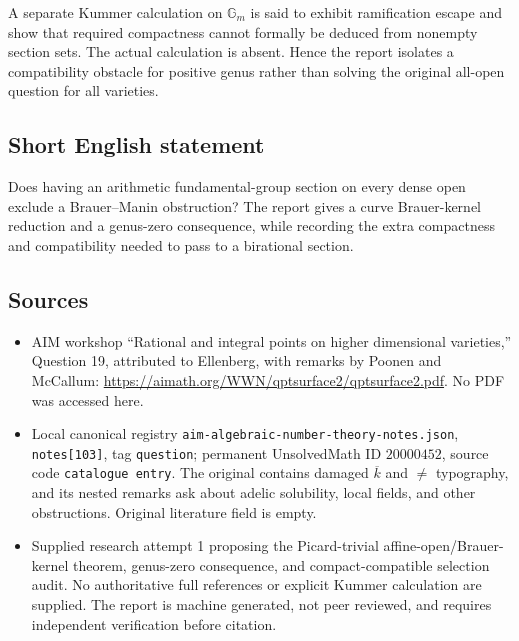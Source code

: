 \documentclass[11pt]{article}
\begin{document}
A separate Kummer calculation on \(\mathbb G_m\) is said to exhibit ramification escape and show that required compactness cannot formally be deduced from nonempty section sets. The actual calculation is absent. Hence the report isolates a compatibility obstacle for positive genus rather than solving the original all-open question for all varieties.
\subsection{Short English statement}
Does having an arithmetic fundamental-group section on every dense open exclude a Brauer--Manin obstruction? The report gives a curve Brauer-kernel reduction and a genus-zero consequence, while recording the extra compactness and compatibility needed to pass to a birational section.
\subsection{Sources}
\begin{itemize}
\item AIM workshop ``Rational and integral points on higher dimensional varieties,'' Question 19, attributed to Ellenberg, with remarks by Poonen and McCallum: \url{https://aimath.org/WWN/qptsurface2/qptsurface2.pdf}. No PDF was accessed here.
\item Local canonical registry \texttt{aim-algebraic-number-theory-notes.json}, \texttt{notes[103]}, tag \texttt{question}; permanent UnsolvedMath ID \(20000452\), source code \texttt{catalogue entry}. The original contains damaged \(\overline k\) and \(\ne\) typography, and its nested remarks ask about adelic solubility, local fields, and other obstructions. Original literature field is empty.
\item Supplied research attempt 1 proposing the Picard-trivial affine-open/Brauer-kernel theorem, genus-zero consequence, and compact-compatible selection audit. No authoritative full references or explicit Kummer calculation are supplied. The report is machine generated, not peer reviewed, and requires independent verification before citation.
\end{itemize}
\end{document}
